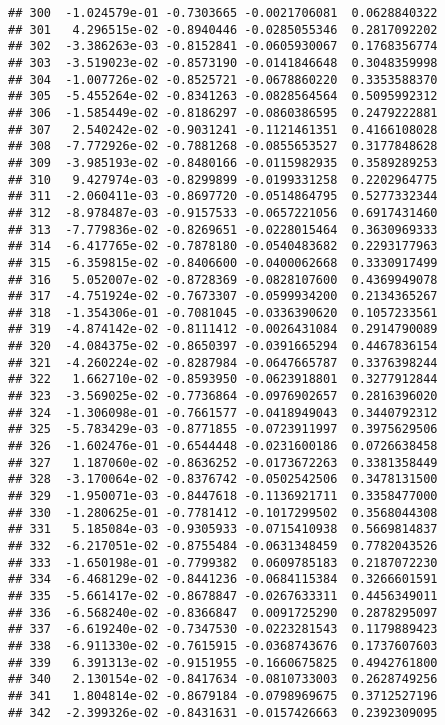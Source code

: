 \documentclass[
]{article}
\begin{document}
\begin{verbatim}
## 300  -1.024579e-01 -0.7303665 -0.0021706081  0.0628840322
## 301   4.296515e-02 -0.8940446 -0.0285055346  0.2817092202
## 302  -3.386263e-03 -0.8152841 -0.0605930067  0.1768356774
## 303  -3.519023e-02 -0.8573190 -0.0141846648  0.3048359998
## 304  -1.007726e-02 -0.8525721 -0.0678860220  0.3353588370
## 305  -5.455264e-02 -0.8341263 -0.0828564564  0.5095992312
## 306  -1.585449e-02 -0.8186297 -0.0860386595  0.2479222881
## 307   2.540242e-02 -0.9031241 -0.1121461351  0.4166108028
## 308  -7.772926e-02 -0.7881268 -0.0855653527  0.3177848628
## 309  -3.985193e-02 -0.8480166 -0.0115982935  0.3589289253
## 310   9.427974e-03 -0.8299899 -0.0199331258  0.2202964775
## 311  -2.060411e-03 -0.8697720 -0.0514864795  0.5277332344
## 312  -8.978487e-03 -0.9157533 -0.0657221056  0.6917431460
## 313  -7.779836e-02 -0.8269651 -0.0228015464  0.3630969333
## 314  -6.417765e-02 -0.7878180 -0.0540483682  0.2293177963
## 315  -6.359815e-02 -0.8406600 -0.0400062668  0.3330917499
## 316   5.052007e-02 -0.8728369 -0.0828107600  0.4369949078
## 317  -4.751924e-02 -0.7673307 -0.0599934200  0.2134365267
## 318  -1.354306e-01 -0.7081045 -0.0336390620  0.1057233561
## 319  -4.874142e-02 -0.8111412 -0.0026431084  0.2914790089
## 320  -4.084375e-02 -0.8650397 -0.0391665294  0.4467836154
## 321  -4.260224e-02 -0.8287984 -0.0647665787  0.3376398244
## 322   1.662710e-02 -0.8593950 -0.0623918801  0.3277912844
## 323  -3.569025e-02 -0.7736864 -0.0976902657  0.2816396020
## 324  -1.306098e-01 -0.7661577 -0.0418949043  0.3440792312
## 325  -5.783429e-03 -0.8771855 -0.0723911997  0.3975629506
## 326  -1.602476e-01 -0.6544448 -0.0231600186  0.0726638458
## 327   1.187060e-02 -0.8636252 -0.0173672263  0.3381358449
## 328  -3.170064e-02 -0.8376742 -0.0502542506  0.3478131500
## 329  -1.950071e-03 -0.8447618 -0.1136921711  0.3358477000
## 330  -1.280625e-01 -0.7781412 -0.1017299502  0.3568044308
## 331   5.185084e-03 -0.9305933 -0.0715410938  0.5669814837
## 332  -6.217051e-02 -0.8755484 -0.0631348459  0.7782043526
## 333  -1.650198e-01 -0.7799382  0.0609785183  0.2187072230
## 334  -6.468129e-02 -0.8441236 -0.0684115384  0.3266601591
## 335  -5.661417e-02 -0.8678847 -0.0267633311  0.4456349011
## 336  -6.568240e-02 -0.8366847  0.0091725290  0.2878295097
## 337  -6.619240e-02 -0.7347530 -0.0223281543  0.1179889423
## 338  -6.911330e-02 -0.7615915 -0.0368743676  0.1737607603
## 339   6.391313e-02 -0.9151955 -0.1660675825  0.4942761800
## 340   2.130154e-02 -0.8417634 -0.0810733003  0.2628749256
## 341   1.804814e-02 -0.8679184 -0.0798969675  0.3712527196
## 342  -2.399326e-02 -0.8431631 -0.0157426663  0.2392309095

\end{verbatim}
\end{document}
